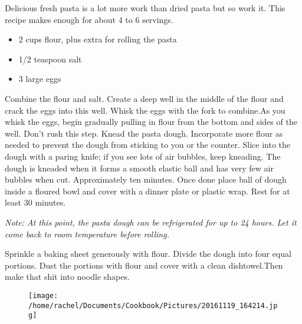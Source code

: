 \documentclass{article}
\begin{document}
\vspace{5mm}

Delicious fresh pasta is a lot more work than dried pasta but so work it. This recipe makes enough for about 4 to 6 servings.

 
\vspace{5mm}
{\selectfont 
    \begin{itemize}[noitemsep]
    
      \item[] 2 cups flour, plus extra for rolling the pasta
      \item[] 1/2 teaspoon salt
      \item[] 3 large eggs
      
    \end{itemize}
    }
\vspace{5mm}
    
Combine the flour and salt. Create a deep well in the middle of the flour and crack the eggs into this well. Whisk the eggs with the fork to combine.As you whisk the eggs, begin gradually pulling in flour from the bottom and sides of the well. Don't rush this step. Knead the pasta dough.  Incorporate more flour as needed to prevent the dough from sticking to you or the counter. Slice into the dough with a paring knife; if you see lots of air bubbles, keep kneading. The dough is kneaded when it forms a smooth elastic ball and has very few air bubbles when cut. Approximately ten minutes. Once done place ball of dough inside a floured bowl and cover with a dinner plate or plastic wrap. Rest for at least 30 minutes. 

\textit{Note: At this point, the pasta dough can be refrigerated for up to 24 hours. Let it come back to room temperature before rolling.} 

Sprinkle a baking sheet generously with flour. Divide the dough into four equal portions. Dust the portions with flour and cover with a clean dishtowel.Then make that shit into noodle shapes.

\restoregeometry










\newpage
\begin{figure}[]
\texttt{[image: /home/rachel/Documents/Cookbook/Pictures/20161119\_164214.jpg]}
\end{figure}
\restoregeometry
\clearpage
\newpage
{}
\end{document}
